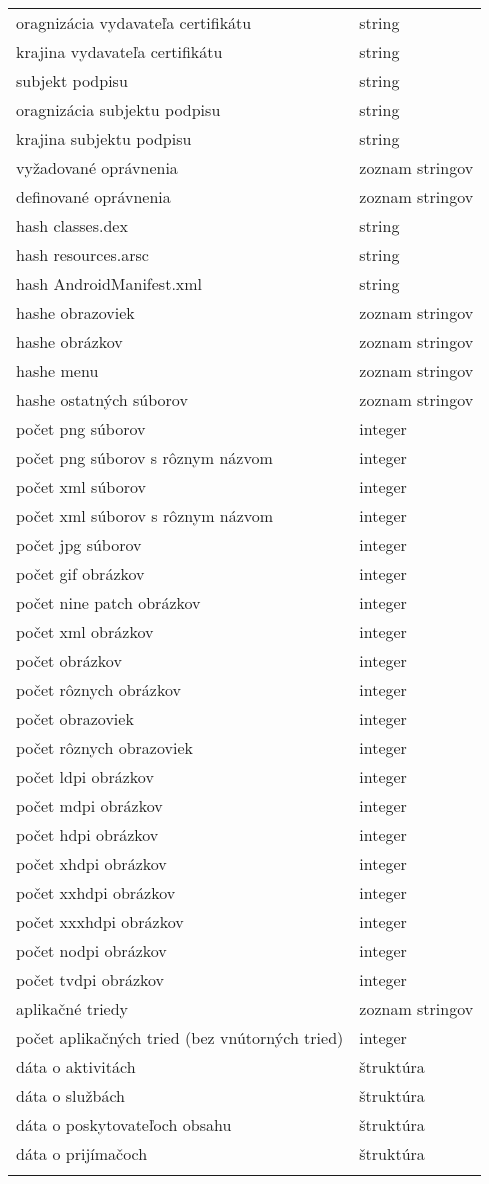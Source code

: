 \begin{longtable}{|l|p{3.3cm}|}
oragnizácia vydavateľa certifikátu						& string\\
krajina vydavateľa certifikátu						& string\\
subjekt podpisu						& string\\
oragnizácia subjektu podpisu						& string\\
krajina subjektu podpisu						& string\\
vyžadované oprávnenia					& zoznam stringov \\
definované oprávnenia					& zoznam stringov \\
hash classes.dex						& string \\
hash resources.arsc						& string \\
hash AndroidManifest.xml				& string \\
hashe obrazoviek						& zoznam stringov \\
hashe obrázkov						& zoznam stringov \\
hashe menu						& zoznam stringov \\
hashe ostatných súborov						& zoznam stringov \\
počet png súborov							& integer \\
počet png súborov s rôznym názvom							& integer \\
počet xml súborov							& integer \\
počet xml súborov s rôznym názvom							& integer \\
počet jpg súborov 					& integer \\
počet gif obrázkov 					& integer \\
počet nine patch obrázkov 					& integer \\
počet xml obrázkov 					& integer \\
počet obrázkov 					& integer \\
počet rôznych obrázkov 					& integer \\
počet obrazoviek 					& integer \\
počet rôznych obrazoviek 					& integer \\
počet ldpi obrázkov					& integer \\
počet mdpi obrázkov 					& integer \\
počet hdpi obrázkov 					& integer \\
počet xhdpi obrázkov 					& integer \\
počet xxhdpi obrázkov 					& integer \\
počet xxxhdpi obrázkov 					& integer \\
počet nodpi obrázkov 					& integer \\
počet tvdpi obrázkov 					& integer \\
aplikačné triedy					& zoznam stringov \\
počet aplikačných tried	(bez vnútorných tried)				& integer \\
dáta o aktivitách				& štruktúra \\
dáta o službách				& štruktúra \\
dáta o poskytovateľoch obsahu				& štruktúra \\
dáta o prijímačoch				& štruktúra \\

  \label{tab:ziskaneData}
\end{longtable}